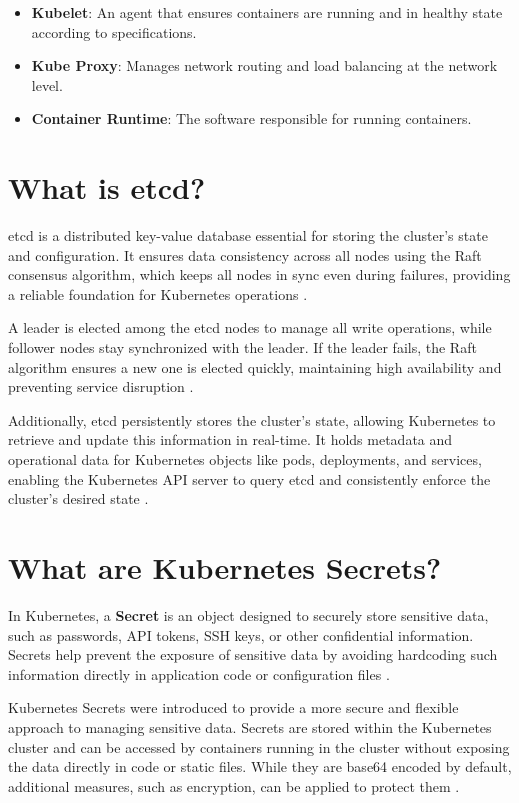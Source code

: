 \documentclass[a4paper,11pt,openright,BCOR=15mm]{scrbook}
\begin{document}
\begin{itemize}
	\item \textbf{Kubelet}: An agent that ensures containers are running and in healthy state according to specifications.
	\item \textbf{Kube Proxy}: Manages network routing and load balancing at the network level.
	\item \textbf{Container Runtime}: The software responsible for running containers.
\end{itemize}

\section{What is etcd?}

etcd is a distributed key-value database essential for storing the cluster’s state and configuration. It ensures data consistency across all nodes using the Raft consensus algorithm, which keeps all nodes in sync even during failures, providing a reliable foundation for Kubernetes operations \cite{etcd_faq_2024}.

A leader is elected among the etcd nodes to manage all write operations, while follower nodes stay synchronized with the leader. If the leader fails, the Raft algorithm ensures a new one is elected quickly, maintaining high availability and preventing service disruption \cite{etcd_faq_2024}.

Additionally, etcd persistently stores the cluster's state, allowing Kubernetes to retrieve and update this information in real-time. It holds metadata and operational data for Kubernetes objects like pods, deployments, and services, enabling the Kubernetes API server to query etcd and consistently enforce the cluster’s desired state \cite{etcd_faq_2024}.

\section{What are Kubernetes Secrets?}

In Kubernetes, a \textbf{Secret} is an object designed to securely store sensitive data, such as passwords, API tokens, SSH keys, or other confidential information. Secrets help prevent the exposure of sensitive data by avoiding hardcoding such information directly in application code or configuration files \cite{the_linux_foundation_secrets_2024}.

Kubernetes Secrets were introduced to provide a more secure and flexible approach to managing sensitive data. Secrets are stored within the Kubernetes cluster and can be accessed by containers running in the cluster without exposing the data directly in code or static files. While they are base64 encoded by default, additional measures, such as encryption, can be applied to protect them \cite{the_linux_foundation_secrets_2024}.
\end{document}
